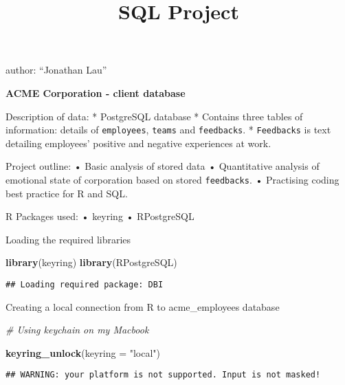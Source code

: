 \documentclass[]{article}
\title{SQL Project}
\author{}
\date{\vspace{-2.5em}}
\newenvironment{Shaded}{\begin{snugshade}}{\end{snugshade}}
\newcommand{\CommentTok}[1]{\textcolor[rgb]{0.56,0.35,0.01}{\textit{#1}}}
\newcommand{\DataTypeTok}[1]{\textcolor[rgb]{0.13,0.29,0.53}{#1}}
\newcommand{\KeywordTok}[1]{\textcolor[rgb]{0.13,0.29,0.53}{\textbf{#1}}}
\newcommand{\NormalTok}[1]{#1}
\newcommand{\StringTok}[1]{\textcolor[rgb]{0.31,0.60,0.02}{#1}}
\begin{document}
\maketitle

\begin{blame}

author: ``Jonathan Lau''

\end{blame}

\begin{emphasis}

\textbf{ACME Corporation - client database}

Description of data: * PostgreSQL database * Contains three tables of
information: details of \texttt{employees}, \texttt{teams} and
\texttt{feedbacks}. * \texttt{Feedbacks} is text detailing employees'
positive and negative experiences at work.

Project outline: • Basic analysis of stored data • Quantitative analysis
of emotional state of corporation based on stored \texttt{feedbacks}. •
Practising coding best practice for R and SQL.

R Packages used: • keyring • RPostgreSQL

\end{emphasis}

Loading the required libraries

\begin{Shaded}
\begin{Highlighting}[]
\KeywordTok{library}\NormalTok{(keyring)}
\KeywordTok{library}\NormalTok{(RPostgreSQL)}
\end{Highlighting}
\end{Shaded}

\begin{verbatim}
## Loading required package: DBI
\end{verbatim}

Creating a local connection from R to acme\_employees database

\begin{Shaded}
\begin{Highlighting}[]
\CommentTok{# Using keychain on my Macbook}

\KeywordTok{keyring_unlock}\NormalTok{(}\DataTypeTok{keyring =} \StringTok{"local"}\NormalTok{)}
\end{Highlighting}
\end{Shaded}

\begin{verbatim}
## WARNING: your platform is not supported. Input is not masked!
\end{verbatim}
\end{document}
